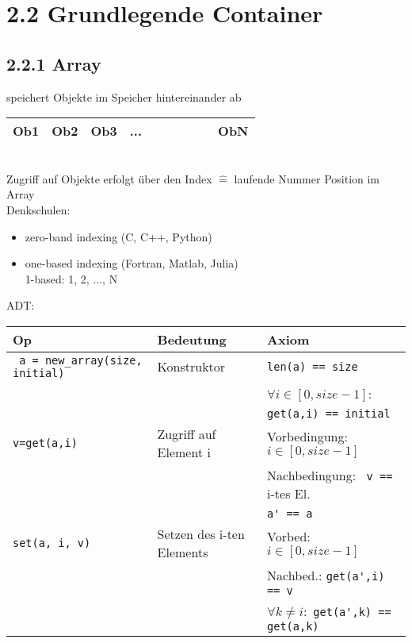 \section*{2.2 Grundlegende Container}

    \subsection*{2.2.1 Array}
    speichert Objekte im Speicher hintereinander ab \\

    \begin{tabular}{| C{1cm} | C{1cm} | C{1cm} | C{1cm} |C{1cm} | C{1cm}| C{1cm} |C{1cm}| C{1cm}| C{1cm}| }
        \hline
        Ob1 & Ob2 & Ob3 & ... & & & & & & ObN \\ \hline
    \end{tabular} \\

    Zugriff auf Objekte erfolgt über den Index $\widehat{=}$ laufende Nummer Position im Array \\

    Denkschulen:
    \begin{itemize}
        \item zero-band indexing (C, C++, Python) \\
        \item one-based indexing (Fortran, Matlab, Julia)\\
        1-based: 1, 2, ..., N
    \end{itemize}

    ADT: \\
    \begin{tabular}{C{5cm} C{5cm} C{5cm}}
        Op & Bedeutung & Axiom \\ \hline
        \verb| a = new_array(size, initial)| & Konstruktor & \verb|len(a) == size| \\
        & & $\forall i \in [0, size - 1]$: \\
        & & \verb|get(a,i) == initial| \\ \hline
        \verb|v=get(a,i)| & Zugriff auf Element i & Vorbedingung: $i \in [0, size-1]$ \\
        & & Nachbedingung: \verb| v ==| i-tes El. \\
        & & \verb|a' == a| \\ \hline
        \verb|set(a, i, v)| & Setzen des i-ten Elements & Vorbed: $ i \in [0, size-1]$ \\
        & & Nachbed.: \verb|get(a',i) == v| \\
        & & $\forall k \neq i:$ \verb|get(a',k) == get(a,k)| \\
    \end{tabular}


